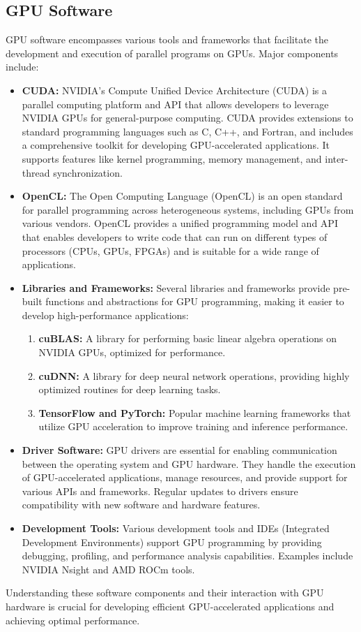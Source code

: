 \subsection{GPU Software}
    GPU software encompasses various tools and frameworks that facilitate the development and execution of parallel programs on GPUs. Major components include:

\begin{itemize}
    \item \textbf{CUDA:} NVIDIA’s Compute Unified Device Architecture (CUDA) is a parallel computing platform and API that allows developers to leverage NVIDIA GPUs for general-purpose computing. CUDA provides extensions to standard programming languages such as C, C++, and Fortran, and includes a comprehensive toolkit for developing GPU-accelerated applications. It supports features like kernel programming, memory management, and inter-thread synchronization.
    \item \textbf{OpenCL:} The Open Computing Language (OpenCL) is an open standard for parallel programming across heterogeneous systems, including GPUs from various vendors. OpenCL provides a unified programming model and API that enables developers to write code that can run on different types of processors (CPUs, GPUs, FPGAs) and is suitable for a wide range of applications.
    \item \textbf{Libraries and Frameworks:} Several libraries and frameworks provide pre-built functions and abstractions for GPU programming, making it easier to develop high-performance applications:
    \begin{enumerate}
        \item \textbf{cuBLAS:} A library for performing basic linear algebra operations on NVIDIA GPUs, optimized for performance.
        \item \textbf{cuDNN:} A library for deep neural network operations, providing highly optimized routines for deep learning tasks.
        \item \textbf{TensorFlow and PyTorch:} Popular machine learning frameworks that utilize GPU acceleration to improve training and inference performance.
    \end{enumerate}
    \item \textbf{Driver Software:} GPU drivers are essential for enabling communication between the operating system and GPU hardware. They handle the execution of GPU-accelerated applications, manage resources, and provide support for various APIs and frameworks. Regular updates to drivers ensure compatibility with new software and hardware features.
    \item \textbf{Development Tools:} Various development tools and IDEs (Integrated Development Environments) support GPU programming by providing debugging, profiling, and performance analysis capabilities. Examples include NVIDIA Nsight and AMD ROCm tools.
\end{itemize}
    
    Understanding these software components and their interaction with GPU hardware is crucial for developing efficient GPU-accelerated applications and achieving optimal performance.
